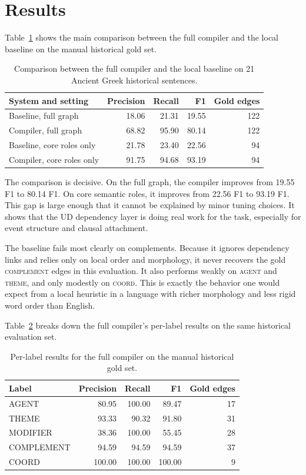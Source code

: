 \documentclass[11pt]{article}
\begin{document}
\section{Results}
Table~\ref{tab:historical-results} shows the main comparison between the full
compiler and the local baseline on the manual historical gold set.

\begin{table}[t]
\centering
\caption{Comparison between the full compiler and the local baseline on 21
Ancient Greek historical sentences.}
\label{tab:historical-results}
\begin{tabular}{lrrrr}
\toprule
System and setting & Precision & Recall & F1 & Gold edges \\
\midrule
Baseline, full graph & 18.06 & 21.31 & 19.55 & 122 \\
Compiler, full graph & 68.82 & 95.90 & 80.14 & 122 \\
Baseline, core roles only & 21.78 & 23.40 & 22.56 & 94 \\
Compiler, core roles only & 91.75 & 94.68 & 93.19 & 94 \\
\bottomrule
\end{tabular}
\end{table}

The comparison is decisive. On the full graph, the compiler improves from 19.55 F1
to 80.14 F1. On core semantic roles, it improves from 22.56 F1 to 93.19 F1.
This gap is large enough that it cannot be explained by minor tuning choices. It
shows that the UD dependency layer is doing real work for the task, especially
for event structure and clausal attachment.

The baseline fails most clearly on complements. Because it ignores dependency
links and relies only on local order and morphology, it never recovers the gold
\textsc{complement} edges in this evaluation. It also performs weakly on
\textsc{agent} and \textsc{theme}, and only modestly on \textsc{coord}. This is
exactly the behavior one would expect from a local heuristic in a language with
richer morphology and less rigid word order than English.

Table~\ref{tab:label-results} breaks down the full compiler's per-label results
on the same historical evaluation set.

\begin{table}[t]
\centering
\caption{Per-label results for the full compiler on the manual historical gold
set.}
\label{tab:label-results}
\begin{tabular}{lrrrr}
\toprule
Label & Precision & Recall & F1 & Gold edges \\
\midrule
AGENT & 80.95 & 100.00 & 89.47 & 17 \\
THEME & 93.33 & 90.32 & 91.80 & 31 \\
MODIFIER & 38.36 & 100.00 & 55.45 & 28 \\
COMPLEMENT & 94.59 & 94.59 & 94.59 & 37 \\
COORD & 100.00 & 100.00 & 100.00 & 9 \\
\bottomrule
\end{tabular}
\end{table}
\end{document}
